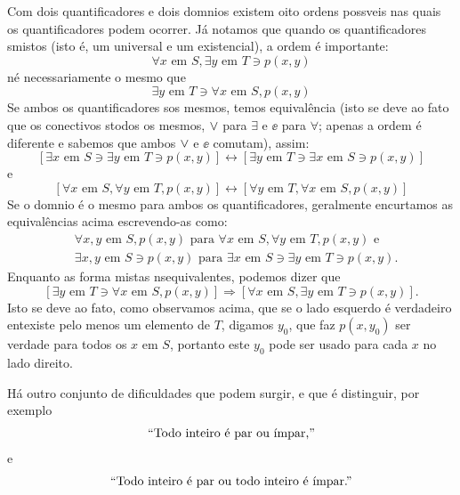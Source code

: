 Com dois quantificadores e dois dom\ih nios existem oito ordens poss\ih veis nas quais os quantificadores podem ocorrer. J\'a notamos que quando os quantificadores s\ao mistos (isto \'e, um universal e um existencial), a ordem \'e importante:
\[
\forall x \textrm{ em } S, \exists y \textrm{ em } T \ni  p(x,y)
\]
n\ao \'e necessariamente o mesmo que
\[
\exists y \textrm{ em } T \ni \forall x \textrm{ em } S, p(x,y)
\]
Se ambos os quantificadores s\ao os mesmos, temos equival\^encia (isto se deve ao fato que os conectivos s\ao todos os mesmos, $\vee$ para $\exists$ e $\ee$ para $\forall$; apenas a ordem \'e diferente e sabemos que ambos $\vee$ e $\ee$ comutam), assim:
\[
[\exists x \textrm{ em } S \ni \exists y \textrm{ em } T \ni p(x,y)]\leftrightarrow[\exists y \textrm{ em } T \ni \exists x \textrm{ em } S \ni p(x,y)]
\]
e
\[
[\forall x \textrm{ em } S, \forall y \textrm{ em } T, p(x,y)]\leftrightarrow[\forall y \textrm{ em } T, \forall x \textrm{ em } S, p(x,y)]
\]
Se o dom\ih nio \'e o mesmo para ambos os quantificadores, geralmente encurtamos as equival\^encias acima escrevendo-as como:
\begin{equation*}
 \begin{aligned}
  &\forall x,y \textrm{ em } S, p(x,y) \textrm{ para }  \forall x \textrm{ em } S, \forall y \textrm{ em } T, p(x,y) \textrm{ e }\\
  &\exists x,y \textrm{ em } S \ni p(x,y) \textrm{ para } \exists x \textrm{ em } S \ni \exists y \textrm{ em } T \ni p(x,y).
 \end{aligned}
\end{equation*}
Enquanto as forma mistas n\ao s\ao equivalentes, podemos dizer que
\[
[\exists y \textrm{ em } T \ni \forall x \textrm{ em } S, p(x,y)]\Rightarrow[\forall x \textrm{ em } S, \exists y \textrm{ em } T \ni  p(x,y)].
\]
Isto se deve ao fato, como observamos acima, que se o lado esquerdo \'e verdadeiro ent\ao existe pelo menos um elemento de $T$, digamos $y_0$, que faz $p(x,y_0)$ ser verdade para todos os $x$ em $S$, portanto este $y_0$ pode ser usado para cada $x$ no lado direito.

H\'a outro conjunto de dificuldades que podem surgir, e que \'e distinguir, por exemplo
\begin{equation*}
 \begin{aligned}
  \text{``Todo inteiro \'e par ou \ih mpar,''}
   \end{aligned}
\end{equation*}
e
\begin{equation*}
 \begin{aligned}
  \text{``Todo inteiro \'e par ou todo inteiro \'e \ih mpar.''}
   \end{aligned}
\end{equation*}

